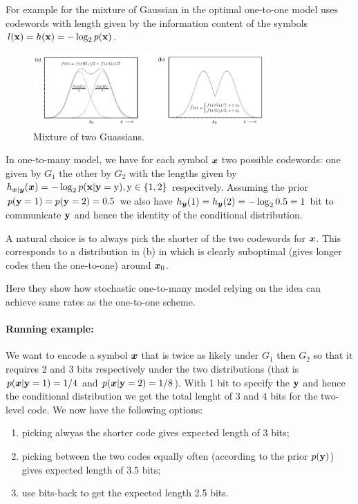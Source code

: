 For example for the mixture of Gaussian in  the optimal one-to-one model uses codewords with length given by the information content of the symbols $l({\mathbf{x}}) = h({\mathbf{x}}) = -\log_2 p({\mathbf{x}})$.

\begin{figure}[h]
\centering
\includegraphics[width=0.8\textwidth]{Pics/Frey1997.png}
\caption{Mixture of two Guassians.}
\label{fig:Frey1997}
\end{figure}

In one-to-many model, we have for each symbol ${\bm{x}}$ two possible codewords: one given by $G_1$ the other by $G_2$ with the lengths given by $h_{{\bm{x}}|{\bm{y}}}({\bm{x}}) = -\log_2 p({\mathbf{x}} | {\mathbf{y}} = {\textnormal{y}}), {\textnormal{y}} \in \{1, 2\}$ respecitvely.
Assuming the prior $p({\mathbf{y}} = 1) = p({\mathbf{y}} = 2) = 0.5$ we also have $h_{{\bm{y}}}(1) = h_{{\bm{y}}}(2) = - \log_2 0.5 = 1$ bit to communicate ${\mathbf{y}}$ and hence the identity of the conditional distribution.

A natural choice is to always pick the shorter of the two codewords for ${\bm{x}}$. This corresponds to a distribution in (b) in  which is clearly suboptimal (gives longer codes then the one-to-one) around ${\bm{x}}_0$.

\begin{notebox}
Here they show how stochastic one-to-many model relying on the  idea can achieve same rates as the one-to-one scheme.
\end{notebox}

\paragraph{Running example: } We want to encode a symbol ${\bm{x}}$ that is twice as likely under $G_1$ then $G_2$ so that it requires 2 and 3 bits respectively under the two distributions (that is $p({\bm{x}} | {\mathbf{y}} = 1) = 1/4$ and $p({\bm{x}} | {\mathbf{y}} = 2) = 1/8$).
With 1 bit to specify the ${\mathbf{y}}$ and hence the conditional distribution we get the total lenght of 3 and 4 bits for the two-level code.
We now have the following options:
\begin{enumerate}[noitemsep, topsep=0pt]
\item picking alwyas the shorter code gives expected length of 3 bits;
\item picking between the two codes equally often (according to the prior $p({\mathbf{y}})$) gives expected length of 3.5 bits;
\item use bits-back to get the expected length 2.5 bits.
\end{enumerate}

